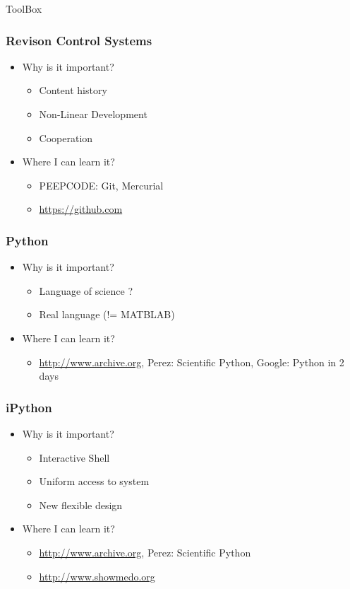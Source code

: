 \documentclass[fleqn]{beamer}
\begin{document}
\begin{section}{ToolBox}
  \begin{frame}\frametitle{Revison Control Systems}
  \begin{itemize}
    \item{Why is it important?}
      \begin{itemize}
      \item Content history
      \item Non-Linear Development
      \item Cooperation
      \end{itemize}
    \item{Where I can learn it?}
      \begin{itemize}
        \item PEEPCODE: Git, Mercurial
        \item \url{https://github.com}
      \end{itemize}
  \end{itemize}
  \end{frame}


  \begin{frame}\frametitle{Python}
  \begin{itemize}
    \item{Why is it important?}
      \begin{itemize}
      \item Language of science ?
      \item Real language (!= MATBLAB)

      \end{itemize}
    \item{Where I can learn it?}
      \begin{itemize}
      \item \url{http://www.archive.org}, Perez: Scientific Python,
        Google: Python in 2 days
      \end{itemize}
  \end{itemize}
  \end{frame}



  \begin{frame}\frametitle{iPython}
  \begin{itemize}
    \item{Why is it important?}
      \begin{itemize}
      \item Interactive Shell
      \item Uniform access to system
      \item New flexible design
      \end{itemize}
    \item{Where I can learn it?}
      \begin{itemize}
      \item \url{http://www.archive.org}, Perez: Scientific Python
      \item \url{http://www.showmedo.org}
      \end{itemize}
  \end{itemize}
  \end{frame}


\end{section}
\end{document}
